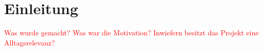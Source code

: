 \chapter{Einleitung}
\label{ch:Einleitung}

\textcolor{red}{Was wurde gemacht? Was war die Motivation? Inwiefern besitzt das Projekt eine Alltagsrelevanz?}